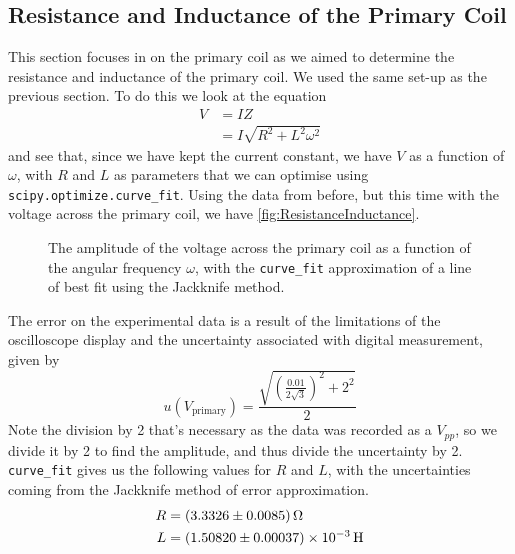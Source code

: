 \documentclass[12pt]{article}
\numberwithin{equation}{section}
\numberwithin{figure}{section}
\numberwithin{table}{section}
\begin{document}
    \subsection{Resistance and Inductance of the Primary Coil}
    This section focuses in on the primary coil as we aimed to determine the resistance and 
    inductance of the primary coil. We used the same set-up as the previous section.
    To do this we look at the equation
    \begin{align*}
        V&=IZ\\
        &=I\sqrt{R^2+L^2\omega^2}
    \end{align*}
    and see that, since we have kept the current constant, we have $V$ as a function of $\omega$, 
    with $R$ and $L$ as parameters that we can optimise using \texttt{scipy.optimize.curve\_fit}. 
    Using the data from before, but this time with the voltage across the primary coil, we have 
    \autoref{fig:ResistanceInductance}.
    \begin{figure}[H]
        \begin{center}
           \caption{The amplitude of the voltage across the primary coil as a function 
           of the angular frequency $\omega$, with the \texttt{curve\_fit} approximation 
           of a line of best fit using the Jackknife method.}
           \label{fig:ResistanceInductance}
        \end{center}
    \end{figure}
    The error on the experimental data is a result of the limitations of the oscilloscope display 
    and the uncertainty associated with digital measurement, given by 
    \begin{equation*}
        u(V_{\text{primary}})=\frac{\sqrt{\left(\frac{0.01}{2\sqrt 3}\right)^2+2^2}}{2}
    \end{equation*}
    Note the division by 2 that's necessary as the data was recorded as a $V_{pp}$, so we divide 
    it by 2 to find the amplitude, and thus divide the uncertainty by 2. \newline
    \texttt{curve\_fit} gives us the following values for $R$ and $L$, with the uncertainties 
    coming from the Jackknife method of error approximation.
    \begin{align*}
        R&=\SI{3.3326\pm0.0085}{\ohm}\\
        L&=\SI{1.50820\pm0.00037e-3}{\henry}
    \end{align*}
\end{document}
